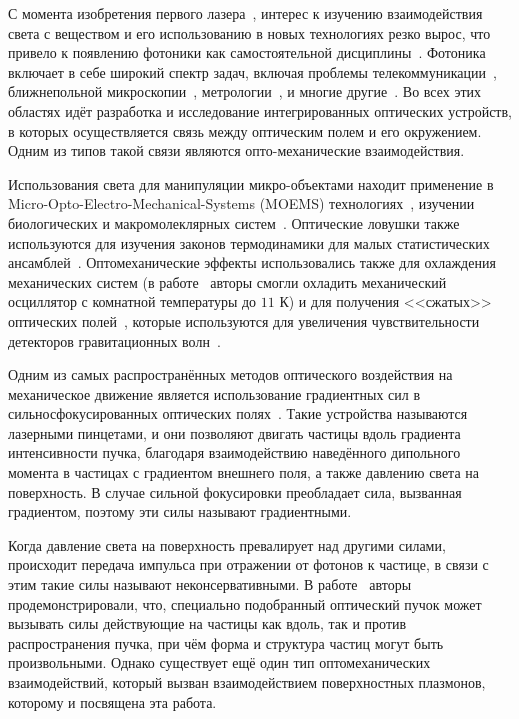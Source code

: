 \intro
С момента изобретения первого лазера~\cite{maiman1960stimulated}, интерес к изучению взаимодействия света с веществом и его использованию в новых технологиях резко вырос, что привело к появлению фотоники как самостоятельной дисциплины~\cite{lifante2003integrated}. Фотоника включает в себе широкий спектр задач, включая проблемы
 телекоммуникации~\cite{agrawal2012fiber},
 ближнепольной микроскопии~\cite{betzig1992near},
 метрологии~\cite{kim2009metrology},
и многие другие~\cite{saleh2019fundamentals}. Во всех этих областях идёт разработка и исследование интегрированных оптических устройств, в которых осуществляется связь между оптическим полем и его окружением.  Одним из типов такой связи являются опто-механические взаимодействия. 

Использования света для манипуляции микро-объектами находит применение в Micro-Opto-Electro-Mechanical-Systems (MOEMS) технологиях~\cite{motamedi1994micro}, изучении биологических и макромолеклярных систем~\cite{Ashkin1517,grier2003revolution}. Оптические ловушки также используются для изучения законов термодинамики для малых статистических ансамблей~\cite{wang2002experimental}. Оптомеханические эффекты использовались также для охлаждения механических систем (в работе~\cite{schliesser2006radiation} авторы смогли охладить механический осциллятор с комнатной температуры до $11$ К) и для получения <<сжатых>> оптических полей~\cite{fabre1994quantum}, которые используются для увеличения чувствительности детекторов гравитационных волн~\cite{aasi2013enhanced}.

Одним из самых распространённых методов оптического воздействия на механическое движение является использование градиентных сил в сильносфокусированных оптических полях~\cite{ashkin1986observation}. Такие устройства называются лазерными пинцетами, и они позволяют двигать частицы вдоль градиента интенсивности пучка, благодаря взаимодействию наведённого дипольного момента в частицах с градиентом внешнего поля, а также давлению света на поверхность. В случае сильной фокусировки преобладает сила, вызванная градиентом, поэтому эти силы называют градиентными.

Когда давление света на поверхность превалирует над другими силами, происходит передача импульса при отражении от фотонов к частице, в связи с этим такие силы называют неконсервативными. В работе~\cite{sukhov2011negative} авторы продемонстрировали, что, специально подобранный оптический пучок может вызывать силы действующие на частицы как вдоль, так и против распространения пучка, при чём форма и структура частиц могут быть произвольными. Однако существует ещё один тип оптомеханических взаимодействий, который вызван взаимодействием поверхностных плазмонов, которому и посвящена эта работа.

